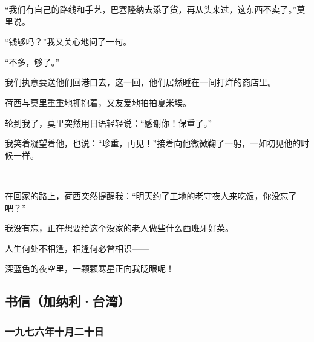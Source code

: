 \par “我们有自己的路线和手艺，巴塞隆纳去添了货，再从头来过，这东西不卖了。”莫里说。
\par “钱够吗？”我又关心地问了一句。
\par “不多，够了。”
\par 我们执意要送他们回港口去，这一回，他们居然睡在一间打烊的商店里。
\par 荷西与莫里重重地拥抱着，又友爱地拍拍夏米埃。
\par 轮到我了，莫里突然用日语轻轻说：“感谢你！保重了。”
\par 我笑着凝望着他，也说：“珍重，再见！”接着向他微微鞠了一躬，一如初见他的时候一样。
\par  
\par 在回家的路上，荷西突然提醒我：“明天约了工地的老守夜人来吃饭，你没忘了吧？”
\par 我没有忘，正在想要给这个没家的老人做些什么西班牙好菜。
\par 人生何处不相逢，相逢何必曾相识——
\par 深蓝色的夜空里，一颗颗寒星正向我眨眼呢！


\subsection{书信（加纳利·台湾）}



\subsubsection{一九七六年十月二十日}


